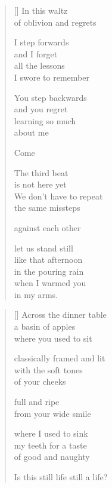 \documentclass[14pt]{extbook}
\newcommand*{\centeredornament}{\centerline{\pgfornament[width=6cm]{88}}}
\begin{document}

\newpage

\vspace*{-15mm}
\centeredornament
\vspace*{-7mm}


\settowidth{\versewidth}{We don't have to repeat}

\begin{verse}[\versewidth]
  In this waltz \\
  of oblivion and regrets

  I step forwards \\
  and I forget \\
  all the lessons \\
  I swore to remember

  You step backwards \\
  and you regret \\
  learning so much \\
  about me

  Come

  The third beat \\
  is not here yet \\
  We don't have to repeat \\
  the same missteps

  against each other

  let us stand still \\
  like that afternoon \\
  in the pouring rain \\
  when I warmed you \\
  in my arms.
\end{verse}


\newpage

\vspace*{-15mm}
\centeredornament
\vspace*{-7mm}


\settowidth{\versewidth}{Is this still life still a life?}

\begin{verse}[\versewidth]
  Across the dinner table \\
  a basin of apples \\
  where you used to sit

  classically framed and lit \\
  with the soft tones \\
  of your cheeks

  full and ripe \\
  from your wide smile

  where I used to sink \\
  my teeth for a taste \\
  of good and naughty

  Is this still life still a life?
\end{verse}
\end{document}
